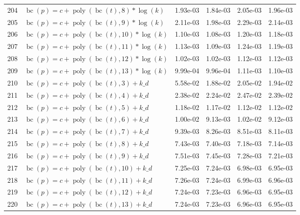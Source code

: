 \documentclass[12pt,a4paper]{article}
\DeclareMathOperator{\bc}{bc}
\DeclareMathOperator{\poly}{poly}
\begin{document}
\begin{longtable}[t]{ll>{\raggedleft\arraybackslash}p{2cm}>{\raggedleft\arraybackslash}p{2cm}>{\raggedleft\arraybackslash}p{2cm}>{\raggedleft\arraybackslash}p{2cm}}
204 & $\bc(p) = c + \poly\left( \bc(t), 8 \right) * \log(k)$ & 1.93e-03 & 1.84e-03 & 2.05e-03 & 1.96e-03\\
\rowcolor{gray!6}  205 & $\bc(p) = c + \poly\left( \bc(t), 9 \right) * \log(k)$ & 2.11e-03 & 1.98e-03 & 2.29e-03 & 2.14e-03\\
206 & $\bc(p) = c + \poly\left( \bc(t), 10 \right) * \log(k)$ & 1.10e-03 & 1.08e-03 & 1.20e-03 & 1.18e-03\\
\rowcolor{gray!6}  207 & $\bc(p) = c + \poly\left( \bc(t), 11 \right) * \log(k)$ & 1.13e-03 & 1.09e-03 & 1.24e-03 & 1.19e-03\\
208 & $\bc(p) = c + \poly\left( \bc(t), 12 \right) * \log(k)$ & 1.02e-03 & 1.02e-03 & 1.12e-03 & 1.12e-03\\
\rowcolor{gray!6}  209 & $\bc(p) = c + \poly\left( \bc(t), 13 \right) * \log(k)$ & 9.99e-04 & 9.96e-04 & 1.11e-03 & 1.10e-03\\
210 & $\bc(p) = c + \poly\left( \bc(t), 3 \right) + k\_d$ & 5.58e-02 & 1.88e-02 & 2.05e-02 & 1.94e-02\\
\rowcolor{gray!6}  211 & $\bc(p) = c + \poly\left( \bc(t), 4 \right) + k\_d$ & 2.38e-02 & 2.24e-02 & 2.47e-02 & 2.39e-02\\
212 & $\bc(p) = c + \poly\left( \bc(t), 5 \right) + k\_d$ & 1.18e-02 & 1.17e-02 & 1.12e-02 & 1.12e-02\\
\rowcolor{gray!6}  213 & $\bc(p) = c + \poly\left( \bc(t), 6 \right) + k\_d$ & 1.00e-02 & 9.13e-03 & 1.02e-02 & 9.12e-03\\
214 & $\bc(p) = c + \poly\left( \bc(t), 7 \right) + k\_d$ & 9.39e-03 & 8.26e-03 & 8.51e-03 & 8.11e-03\\
\rowcolor{gray!6}  215 & $\bc(p) = c + \poly\left( \bc(t), 8 \right) + k\_d$ & 7.43e-03 & 7.40e-03 & 7.18e-03 & 7.14e-03\\
216 & $\bc(p) = c + \poly\left( \bc(t), 9 \right) + k\_d$ & 7.51e-03 & 7.45e-03 & 7.28e-03 & 7.21e-03\\
\rowcolor{gray!6}  217 & $\bc(p) = c + \poly\left( \bc(t), 10 \right) + k\_d$ & 7.25e-03 & 7.24e-03 & 6.98e-03 & 6.95e-03\\
218 & $\bc(p) = c + \poly\left( \bc(t), 11 \right) + k\_d$ & 7.26e-03 & 7.24e-03 & 6.99e-03 & 6.96e-03\\
\rowcolor{gray!6}  219 & $\bc(p) = c + \poly\left( \bc(t), 12 \right) + k\_d$ & 7.24e-03 & 7.23e-03 & 6.96e-03 & 6.95e-03\\
220 & $\bc(p) = c + \poly\left( \bc(t), 13 \right) + k\_d$ & 7.24e-03 & 7.23e-03 & 6.96e-03 & 6.95e-03\\

\end{longtable}
\end{document}
